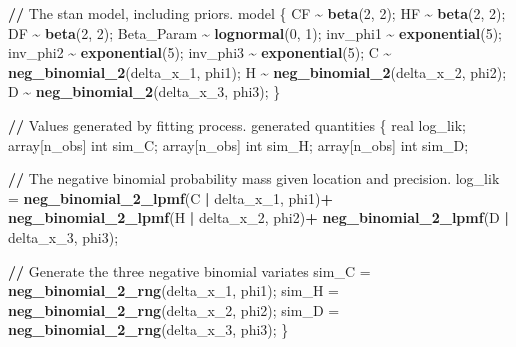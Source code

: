 \documentclass[10pt,letterpaper]{article}
\newenvironment{Shaded}{\begin{snugshade}}{\end{snugshade}}
\newcommand{\DecValTok}[1]{\textcolor[rgb]{0.00,0.00,0.81}{#1}}
\newcommand{\ErrorTok}[1]{\textcolor[rgb]{0.64,0.00,0.00}{\textbf{#1}}}
\newcommand{\FunctionTok}[1]{\textcolor[rgb]{0.13,0.29,0.53}{\textbf{#1}}}
\newcommand{\NormalTok}[1]{#1}
\newcommand{\OtherTok}[1]{\textcolor[rgb]{0.56,0.35,0.01}{#1}}
\newcommand{\SpecialCharTok}[1]{\textcolor[rgb]{0.81,0.36,0.00}{\textbf{#1}}}
\begin{document}
\begin{Shaded}
\begin{Highlighting}[]
\SpecialCharTok{/}\ErrorTok{/}\NormalTok{ The stan model, including priors.}
\NormalTok{model \{}
\NormalTok{  CF }\SpecialCharTok{\textasciitilde{}} \FunctionTok{beta}\NormalTok{(}\DecValTok{2}\NormalTok{, }\DecValTok{2}\NormalTok{);}
\NormalTok{  HF }\SpecialCharTok{\textasciitilde{}} \FunctionTok{beta}\NormalTok{(}\DecValTok{2}\NormalTok{, }\DecValTok{2}\NormalTok{);}
\NormalTok{  DF }\SpecialCharTok{\textasciitilde{}} \FunctionTok{beta}\NormalTok{(}\DecValTok{2}\NormalTok{, }\DecValTok{2}\NormalTok{);}
\NormalTok{  Beta\_Param }\SpecialCharTok{\textasciitilde{}} \FunctionTok{lognormal}\NormalTok{(}\DecValTok{0}\NormalTok{, }\DecValTok{1}\NormalTok{);}
\NormalTok{  inv\_phi1 }\SpecialCharTok{\textasciitilde{}} \FunctionTok{exponential}\NormalTok{(}\DecValTok{5}\NormalTok{);}
\NormalTok{  inv\_phi2 }\SpecialCharTok{\textasciitilde{}} \FunctionTok{exponential}\NormalTok{(}\DecValTok{5}\NormalTok{);}
\NormalTok{  inv\_phi3 }\SpecialCharTok{\textasciitilde{}} \FunctionTok{exponential}\NormalTok{(}\DecValTok{5}\NormalTok{);}
\NormalTok{  C }\SpecialCharTok{\textasciitilde{}} \FunctionTok{neg\_binomial\_2}\NormalTok{(delta\_x\_1, phi1);}
\NormalTok{  H }\SpecialCharTok{\textasciitilde{}} \FunctionTok{neg\_binomial\_2}\NormalTok{(delta\_x\_2, phi2);}
\NormalTok{  D }\SpecialCharTok{\textasciitilde{}} \FunctionTok{neg\_binomial\_2}\NormalTok{(delta\_x\_3, phi3);}
\NormalTok{\}}

\SpecialCharTok{/}\ErrorTok{/}\NormalTok{ Values generated by fitting process.}
\NormalTok{generated quantities \{}
\NormalTok{  real log\_lik;}
\NormalTok{  array[n\_obs] int sim\_C;}
\NormalTok{  array[n\_obs] int sim\_H;}
\NormalTok{  array[n\_obs] int sim\_D;}
  
  \SpecialCharTok{/}\ErrorTok{/}\NormalTok{ The negative binomial probability mass given location and precision.}
\NormalTok{  log\_lik }\OtherTok{=} \FunctionTok{neg\_binomial\_2\_lpmf}\NormalTok{(C }\SpecialCharTok{|}\NormalTok{ delta\_x\_1, phi1)}\SpecialCharTok{+}
            \FunctionTok{neg\_binomial\_2\_lpmf}\NormalTok{(H }\SpecialCharTok{|}\NormalTok{ delta\_x\_2, phi2)}\SpecialCharTok{+}
            \FunctionTok{neg\_binomial\_2\_lpmf}\NormalTok{(D }\SpecialCharTok{|}\NormalTok{ delta\_x\_3, phi3);}
  
  \SpecialCharTok{/}\ErrorTok{/}\NormalTok{ Generate the three negative binomial variates}
\NormalTok{  sim\_C }\OtherTok{=} \FunctionTok{neg\_binomial\_2\_rng}\NormalTok{(delta\_x\_1, phi1);}
\NormalTok{  sim\_H }\OtherTok{=} \FunctionTok{neg\_binomial\_2\_rng}\NormalTok{(delta\_x\_2, phi2);}
\NormalTok{  sim\_D }\OtherTok{=} \FunctionTok{neg\_binomial\_2\_rng}\NormalTok{(delta\_x\_3, phi3);}
\NormalTok{\}}
\end{Highlighting}
\end{Shaded}
\end{document}
